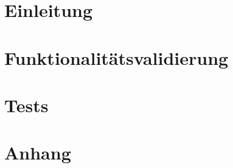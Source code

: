 

	\maketitle
	\setcounter{tocdepth}{1}
	\tableofcontents

	\chapter{Einleitung}
		
	\chapter{Funktionalitätsvalidierung}
	\chapter{Tests}
	\label{chap:test}
		
	\chapter{Anhang}
	\label{anhang}
		

